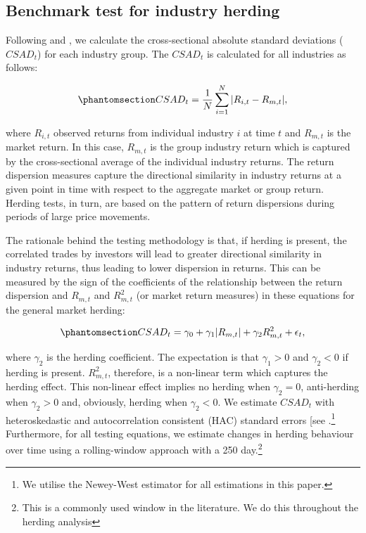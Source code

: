 \documentclass[
  letterpaper,
  DIV=11,
  numbers=noendperiod]{scrartcl}
\begin{document}
\subsection{Benchmark test for industry
herding}\label{benchmark-test-for-industry-herding}

Following \citet{christie1995following} and
\citet{chang2000examination}, we calculate the cross-sectional absolute
standard deviations (\(CSAD_{t}\)) for each industry group. The
\(CSAD_{t}\) is calculated for all industries as follows:

\begin{equation}\phantomsection\label{eq-csad}{
CSAD_{t} = \frac{1}{N}\sum_{i =1}^{N}{|R_{i,t} - R_{m,t}|},
}\end{equation}

where \(R_{i,t}\) observed returns from individual industry \(i\) at
time \(t\) and \(R_{m,t}\) is the market return. In this case,
\(R_{m,t}\) is the group industry return which is captured by the
cross-sectional average of the individual industry returns. The return
dispersion measures capture the directional similarity in industry
returns at a given point in time with respect to the aggregate market or
group return. Herding tests, in turn, are based on the pattern of return
dispersions during periods of large price movements.

The rationale behind the testing methodology is that, if herding is
present, the correlated trades by investors will lead to greater
directional similarity in industry returns, thus leading to lower
dispersion in returns. This can be measured by the sign of the
coefficients of the relationship between the return dispersion and
\(R_{m, t}\) and \(R_{m, t}^2\) (or market return measures) in these
equations for the general market herding:

\begin{equation}\phantomsection\label{eq-csad2}{
CSAD_{t} = \gamma_0 +  \gamma_1|R_{m, t}| +  \gamma_2R_{m, t}^2 + \epsilon_{t},
}\end{equation}

where \(\gamma_2\) is the herding coefficient. The expectation is that
\(\gamma_1 > 0\) and \(\gamma_2 < 0\) if herding is present.
\(R_{m, t}^2\), therefore, is a non-linear term which captures the
herding effect. This non-linear effect implies no herding when
\(\gamma_2 = 0\), anti-herding when \(\gamma_2 > 0\) and, obviously,
herding when \(\gamma_2 < 0\). We estimate \(CSAD_{t}\) with
heteroskedastic and autocorrelation consistent (HAC) standard errors
{[}see \citet{newey1987simple}.\footnote{We utilise the Newey-West
  estimator for all estimations in this paper.} Furthermore, for all
testing equations, we estimate changes in herding behaviour over time
using a rolling-window approach with a 250 day.\footnote{This is a
  commonly used window in the literature. We do this throughout the
  herding analysis}
\end{document}
